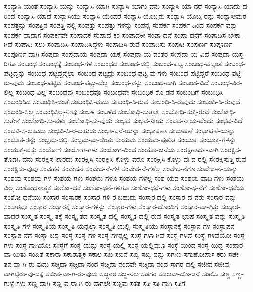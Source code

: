 {ಸಂನ್ಯಾಸಿ-ಯಂತೆ
ಸಂನ್ಯಾಸಿ-ಯನ್ನು
ಸಂನ್ಯಾಸಿ-ಯಾಗಿ
ಸಂನ್ಯಾಸಿ-ಯಾಗು-ವೆನು
ಸಂನ್ಯಾಸಿ-ಯಾ-ದರೆ
ಸಂನ್ಯಾಸಿ-ಯಾದು-ದ-ರಿಂದ
ಸಂನ್ಯಾಸಿ-ಯಾದೆ
ಸಂನ್ಯಾಸಿಯು
ಸಂನ್ಯಾಸಿ-ಯೆಂದರೆ
ಸಂನ್ಯಾಸಿ-ಯೊಬ್ಬನು
ಸಂನ್ಯಾಸಿ-ಯೊಬ್ಬ-ರನ್ನು
ಸಂನ್ಯಾಸೀಮಠ
ಸಂಪತ್ತನ್ನು
ಸಂಪತ್ತಿನ
ಸಂಪತ್ತಿ-ನಲ್ಲಿ
ಸಂಪತ್ತು
ಸಂಪತ್ತು-ಗಳನ್ನು
ಸಂಪನ್ನ
ಸಂಪರ್ಕ
ಸಂಪರ್ಕ-ದಿಂದ
ಸಂಪರ್ಕ-ವನ್ನು
ಸಂಪರ್ಕ-ವಾದಾಗ
ಸಂಪರ್ಕವೇ
ಸಂಪಾದಕ
ಸಂಪಾದ-ಕರ
ಸಂಪಾದಕೀ
ಸಂಪಾ-ದನೆ
ಸಂಪಾ-ದನೆಗೆ
ಸಂಪಾದಿಸ-ಬೇಕಾ-ಗಿದೆ
ಸಂಪಾದಿ-ಸಲು
ಸಂಪಾದಿಸಿ
ಸಂಪಾದಿಸಿದ್ದಳು
ಸಂಪಾದಿಸಿ-ರುವೆ
ಸಂಪಾದಿಸು
ಸಂಪುಟ
ಸಂಪುರ್ಣ
ಸಂಪೂರ್ಣ
ಸಂಪೂರ್ಣ-ವಾಗಿ
ಸಂಪ್ರದಾ
ಸಂಪ್ರದಾಯ
ಸಂಪ್ರದಾ-ಯಕ್ಕೆ
ಸಂಪ್ರದಾ-ಯ-ವಂತರ
ಸಂಪ್ರದಾ-ಯ-ವಿದೆ
ಸಂಪ್ರದಾ-ಯಸ್ಥ-ರಿಗೂ
ಸಂಬಂಧ
ಸಂಬಂಧಕ್ಕೆ
ಸಂಬಂಧ-ಗಳ
ಸಂಬಂಧದ
ಸಂಬಂಧ-ದಲ್ಲಿ
ಸಂಬಂಧ-ಪಟ್ಟ
ಸಂಬಂಧ-ಪಟ್ಟಂತೆ
ಸಂಬಂಧ-ಪಟ್ಟದ್ದನ್ನು
ಸಂಬಂಧ-ಪಟ್ಟದ್ದನ್ನೆಲ್ಲಾ
ಸಂಬಂಧ-ಪಟ್ಟದ್ದು
ಸಂಬಂಧ-ಪಟ್ಟ-ವು-ಗಳು
ಸಂಬಂಧ-ಪಟ್ಟಿದ್ದರೆ
ಸಂಬಂಧ-ಪಟ್ಟಿ-ರು-ವುದು
ಸಂಬಂಧ-ಪಟ್ಟಿವೆ
ಸಂಬಂಧ-ಪಟ್ಟು-ದೆಲ್ಲ
ಸಂಬಂಧ-ವನ್ನು
ಸಂಬಂಧ-ವಾಗಿ
ಸಂಬಂಧ-ವಿದೆ
ಸಂಬಂಧ-ವಿರ-ಲಿಲ್ಲ
ಸಂಬಂಧ-ವಿಲ್ಲ
ಸಂಬಂಧವು
ಸಂಬಂಧವೂ
ಸಂಬಂಧವೇ
ಸಂಬಂಧಿಕ-ರೊ-ಡನೆ
ಸಂಬಂಧಿಗೆ
ಸಂಬಂಧಿಸಿ
ಸಂಬಂಧಿಸಿದ
ಸಂಬಂಧಿಸಿ-ದಂತೆ
ಸಂಬಂಧಿಸಿ-ದುದು
ಸಂಬಂಧಿ-ಸಿ-ರುವ
ಸಂಬಂಧಿ-ಸಿ-ರುವುದು
ಸಂಬಂಧಿ-ಸಿ-ರುವುದೆ
ಸಂಬಂಧಿ-ಸಿಲ್ಲ
ಸಂಬಂಧಿಸಿಲ್ಲ-ನೀವು
ಸಂಬಳ
ಸಂಬಳದ
ಸಂಬೋಧಿ-ಸುತ್ತಲೇ
ಸಂಬೋಧಿ-ಸುತ್ತಿ-ರುವೆ
ಸಂಬೋಧಿ-ಸುತ್ತೇನೆ
ಸಂಬೋಧಿ-ಸು-ವಳು
ಸಂಬೋಧಿ-ಸು-ವುದು
ಸಂಭವ
ಸಂಭವ-ನೀಯ
ಸಂಭವ-ನೀಯ-ವೆಂದು
ಸಂಭವ-ವಿದೆ
ಸಂಭವಿ-ಸ-ಬಹುದು
ಸಂಭವಿ-ಸಿ-ರ-ಬಹುದು
ಸಂಭಾ-ವನೆ-ಯನ್ನು
ಸಂಭಾಷಣಾ
ಸಂಭಾಷಣೆ
ಸಂಭಾಷಣೆ-ಯನ್ನು
ಸಂಭೂತ-ರನ್ನು
ಸಂಭ್ರಮ-ದಲ್ಲಿ
ಸಂಭ್ರಮ-ವಾ-ಯಿತು
ಸಂಯಮ
ಸಂಯಮ-ಪೂರಿತ
ಸಂಯುಕ್ತ
ಸಂಯುಕ್ತ-ಗಳನ್ನು
ಸಂಯುಕ್ತ-ವಸ್ತು
ಸಂಯೋಗ
ಸಂಯೋಗ-ಗಳು
ಸಂಯೋಗ-ದಿಂದ
ಸಂಯೋ-ಜನೆಯ
ಸಂರಕ್ಷಣಾರ್ಥ-ವಾಗಿ
ಸಂರಕ್ಷಿಸ-ತೊಡಗಿ-ದನು
ಸಂರಕ್ಷಿಸ-ಲಾರದು
ಸಂರಕ್ಷಿಸಿ
ಸಂರಕ್ಷಿಸಿ-ಕೊಳ್ಳು-ವರೊ
ಸಂರಕ್ಷಿಸಿ-ಕೊಳ್ಳು-ವು-ದ-ರಲ್ಲಿ
ಸಂರಕ್ಷಿಸುತ್ತಿ-ರುವ
ಸಂರಕ್ಷಿಸು-ವುವು
ಸಂವಹನ
ಸಂವೇದನೆ
ಸಂವೇದ-ನೆ-ಗಳ
ಸಂವೇದ-ನೆ-ಗಳೆಲ್ಲ
ಸಂವೇದ-ನೆಗೂ
ಸಂವೇದ-ನೆ-ಯನ್ನು
ಸಂಶಯ
ಸಂಶಯ-ಗಳ
ಸಂಶಯ-ಗಳು
ಸಂಶಯ-ಗಳೂ
ಸಂಶಯ-ಗಳೆಲ್ಲ
ಸಂಶ-ಯದ
ಸಂಶಯ-ವಾದಿ-ಗಳು
ಸಂಶಯ-ವಿಲ್ಲ
ಸಂಶೋಧನಾತ್ಮಕ
ಸಂಶೋ-ಧನೆ
ಸಂಶೋ-ಧನೆ-ಗಳಿಗೂ
ಸಂಶೋ-ಧನೆ-ಗಳು
ಸಂಶೋ-ಧ-ನೆಗೆ
ಸಂಶೋ-ಧನೆಯ
ಸಂಶೋ-ಧನೆಯು
ಸಂಸಾರ
ಸಂಸಾರಕ್ಕೆ
ಸಂಸಾರ-ಗಳಿ-ರ-ಬಹುದು
ಸಂಸಾರ-ದಲ್ಲಿ
ಸಂಸಾರ-ದ-ವರು
ಸಂಸಾರ-ವನ್ನು
ಸಂಸಾರವೂ
ಸಂಸ್ಕಾರ
ಸಂಸ್ಕಾರಕ್ಕೆ
ಸಂಸ್ಕಾರ-ಗಳನ್ನು
ಸಂಸ್ಕಾರ-ಗಳು
ಸಂಸ್ಕಾರ-ದೊಂದಿಗೆ
ಸಂಸ್ಕಾರ-ವಾ-ಗಿತ್ತು
ಸಂಸ್ಕಾರ-ವಾದರೆ
ಸಂಸ್ಕೃತ
ಸಂಸ್ಕೃ-ತಕ್ಕೆ
ಸಂಸ್ಕೃ-ತದ
ಸಂಸ್ಕೃತ-ದಲ್ಲಿ
ಸಂಸ್ಕೃತ-ದಲ್ಲಿ-ರುವ
ಸಂಸ್ಕೃತ-ಭಾಷೆ
ಸಂಸ್ಕೃತ-ವನ್ನು
ಸಂಸ್ಕೃತಿ
ಸಂಸ್ಕೃತಿ-ಗಳ
ಸಂಸ್ಕೃತಿಯ
ಸಂಸ್ಕೃತಿ-ಯನ್ನೆಲ್ಲಾ
ಸಂಸ್ಕೃತಿ-ಯಲ್ಲಿ
ಸಂಸ್ಕೃತಿಯು
ಸಂಸ್ಥಾನಕ್ಕೆ
ಸಂಸ್ಥಾನ-ಗಳ
ಸಂಸ್ಥಾಪನೆ
ಸಂಸ್ಥಾಪ-ನೆಗೆ
ಸಂಸ್ಥಾ-ಬದ್ಧ
ಸಂಸ್ಥೆ
ಸಂಸ್ಥೆ-ಗಳ
ಸಂಸ್ಥೆ-ಗಳನ್ನಲ್ಲ
ಸಂಸ್ಥೆ-ಗಳಾ-ಗಿವೆ
ಸಂಸ್ಥೆ-ಗಳಿವೆ
ಸಂಸ್ಥೆ-ಗಳಿವೆಯೋ
ಸಂಸ್ಥೆ-ಗಳು
ಸಂಸ್ಥೆ-ಗಾಗಿಯೋ
ಸಂಸ್ಥೆಗೆ
ಸಂಸ್ಥೆ-ಯನ್ನು
ಸಂಸ್ಥೆ-ಯಲ್ಲಿ
ಸಂಸ್ಥೆ-ಯಲ್ಲಿಯೂ
ಸಂಸ್ಥೆ-ಯಿಂದ
ಸಂಸ್ಥೆ-ಯಿದ್ದ
ಸಂಹಾರ-ವಾ-ಯಿತು
ಸಂಹಿತೆ
ಸಕಾರಾ
ಸಕಾರಾತ್ಮಕ
ಸಕಾಲ
ಸಖ
ಸಖನೆ
ಸಖ್ಯ
ಸಖ್ಯ-ವನ್ನು
ಸಗುಣ
ಸಗುಣೋಪಾಸ-ಕರು
ಸಚೇ-ತನ-ವಾ-ಗಿ-ರು-ವುದು
ಸಚ್ಚಿದಾ
ಸಚ್ಚಿದಾ-ನಂದ
ಸಚ್ಚಿದಾ-ನಂದವೇ
ಸಚ್ಚಿದಾ-ನಂದ-ಸಾಗರ-ದಲ್ಲಿ
ಸಜೀವ
ಸಜೀವ-ವಾಗಿಟ್ಟಿರು-ವು-ದಕ್ಕೆ
ಸಜೀವ-ವಾ-ಗಿ-ರು-ವುದು
ಸಜ್ಜನರ
ಸಜ್ಜ-ನರು
ಸಡಗರ
ಸಡಿಲವಾ-ದೊ-ಡನೆ
ಸಡಿಲಿಸಿ
ಸಣ್ಣ
ಸಣ್ಣ-ಗುಳ್ಳೆ-ಗಳು
ಸಣ್ಣ-ದಾಗಿ
ಸಣ್ಣ-ವ-ರಾ-ಗಿ-ರು-ವಾಗಲೇ
ಸಣ್ಣವು
ಸತತ
ಸತಿ
ಸತಿ-ಗಾಗಿ
ಸತಿಗೆ
}
